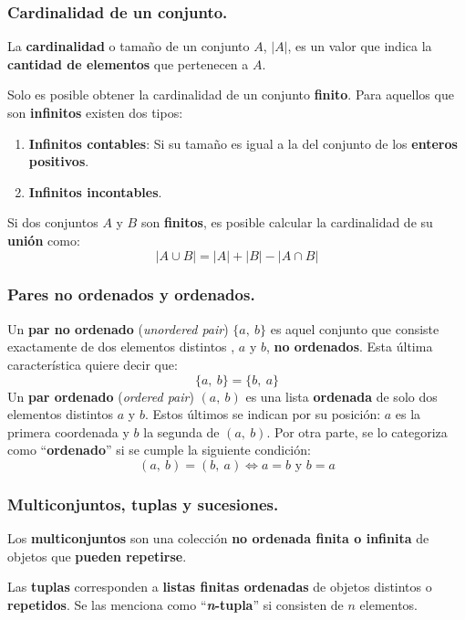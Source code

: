 \documentclass[12pt]{article}
\begin{document}
\subsubsection{Cardinalidad de un conjunto.}

La \textbf{cardinalidad} o tamaño de un conjunto $A$, $|A|$, es un valor que indica la \textbf{cantidad de elementos} que pertenecen a $A$.

Solo es posible obtener la cardinalidad de un conjunto \textbf{finito}. Para aquellos que son \textbf{infinitos} existen dos tipos:

\begin{enumerate}
\item \textbf{Infinitos contables}: Si su tamaño es igual a la del conjunto de los \textbf{enteros positivos}.

\item \textbf{Infinitos incontables}.
\end{enumerate}

Si dos conjuntos $A$ y $B$ son \textbf{finitos}, es posible calcular la cardinalidad de su \textbf{unión} como:
\[
  |A \cup B| = |A| + |B| - |A \cap B|
\]

\subsubsection{Pares no ordenados y ordenados.}

Un \textbf{par no ordenado} (\textit{unordered pair}) $\{a, \ b\}$ es aquel conjunto que consiste exactamente de dos elementos distintos , $a$ y $b$, \textbf{no ordenados}. Esta última característica quiere decir que:
\[
  \{a, \ b\} = \{b, \ a\}
\]
Un \textbf{par ordenado} (\textit{ordered pair}) $(a, \ b)$ es una lista \textbf{ordenada} de solo dos elementos distintos $a$ y $b$. Estos últimos se indican por su posición: $a$ es la primera coordenada y $b$ la segunda de $(a, \ b)$. Por otra parte, se lo categoriza como ``\textbf{ordenado}'' si se cumple la siguiente condición:
\[
  (a, \ b) = (b, \ a) \iff a = b \text{ y } b = a
\]

\subsubsection{Multiconjuntos, tuplas y sucesiones.}

Los \textbf{multiconjuntos} son una colección \textbf{no ordenada finita o infinita} de objetos que \textbf{pueden repetirse}.

Las \textbf{tuplas} corresponden a \textbf{listas finitas ordenadas} de objetos distintos o \textbf{repetidos}. Se las menciona como ``\textbf{\textit{n}-tupla}'' si consisten de $n$ elementos.
\end{document}
